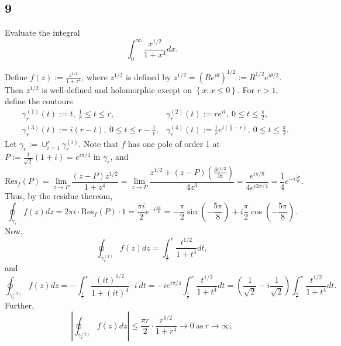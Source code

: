 \documentclass[12pt]{article}
\begin{document}
\subsection*{9}
\begin{tcolorbox}
Evaluate the integral
\[ \int_{0}^{\infty}\frac{x^{1/2}}{1 + x^{4}}dx. \]
\end{tcolorbox}
Define $f(z) := \frac{z^{1/2}}{1 + z^{4}}$, where $z^{1/2}$ is defined by $z^{1/2} = (Re^{i\theta})^{1/2} := R^{1/2}e^{i\theta/2}$. Then $z^{1/2}$ is
well-defined and holomorphic except on $\left\{ x : x \leq 0 \right\}$. For $r > 1$, define the contours
\begin{align*}
& \gamma_{r}^{(1)}(t) := t,\  \frac{1}{r} \leq t \leq r, & \gamma_{r}^{(2)}(t) := re^{it}, \ 0 \leq t \leq \frac{\pi}{2}, \\
& \gamma_{r}^{(3)}(t) := i(r - t), \ 0\leq t \leq r - \frac{1}{r}, & \gamma_{r}^{(4)}(t) := \frac{1}{r}e^{i\left( \frac{\pi}{2} - r \right)},\  0
\leq t \leq \frac{\pi}{2}.
\end{align*}
Let $\gamma_{r} := \cup_{i=1}^{r}\gamma_{r}^{(i)}$. Note that $f$ has one pole of order 1 at $P := \frac{1}{\sqrt{2}}(1 + i) = e^{i\pi / 4}$ in
$\gamma_{r}$, and
\[
  \text{Res}_{f}(P) = \lim_{z\rightarrow P}\frac{(z - P)z^{1/2}}{1 + z^{4}} = \lim_{z\rightarrow P}\frac{z^{1/2} + (z-P)\left(
  \frac{\partial z^{1/2}}{\partial z}\right)}{4z^{3}} = \frac{e^{i\pi/8}}{4e^{i3\pi / 4}} = \frac{1}{4}e^{-i\frac{5\pi}{8}}.
\]
Thus, by the residue thereom,
\begin{equation}
\oint_{\gamma_{r}}f(z)dz = 2\pi i \cdot \text{Res}_{f}(P) \cdot 1 = \frac{\pi i}{2}e^{-i\frac{5\pi}{8}} = -\frac{\pi}{2}
\sin\left( -\frac{5\pi}{8} \right) + i\frac{\pi}{2}\cos\left( -\frac{5\pi}{8} \right).
\label{9.1}
\end{equation}
Now,
\begin{equation}
\oint_{\gamma_{r}^{(1)}}f(z)dz = \int_{\frac{1}{r}}^{r}\frac{t^{1/2}}{1 + t^{4}}dt,
\label{9.2}
\end{equation}
and
\begin{equation}
\oint_{\gamma_{r}^{(3)}}f(z)dz = -\int_{\frac{1}{r}}^{r}\frac{(it)^{1/2}}{1 + (it)^{4}}\cdot i \ dt =
-ie^{i\pi/4}\int_{\frac{1}{r}}^{r}\frac{t^{1/2}}{1 + t^{4}}dt = \left(\frac{1}{\sqrt{2}} -i\frac{1}{\sqrt{2}}\right)\int_{\frac{1}{r}}^{r}\frac{t^{1/2}}{1 + t^{4}}dt.
\label{9.3}
\end{equation}
Further,
\begin{equation}
\left|\oint_{\gamma_{r}^{(2)}}f(z)dz\right| \leq \frac{\pi r}{2}\cdot \frac{r^{1/2}}{1 + r^{4}} \rightarrow 0 \ \text{as}\  r\rightarrow \infty,
\label{9.4}
\end{equation}
\end{document}
